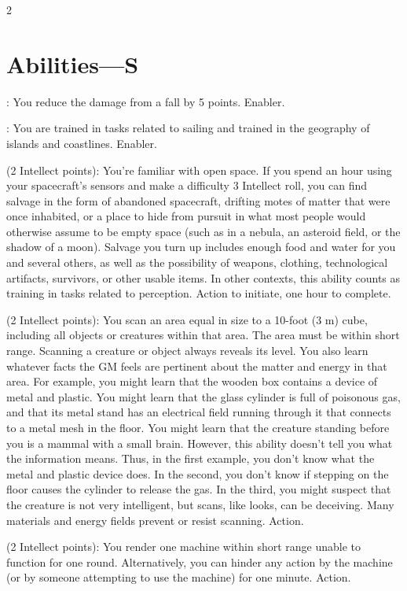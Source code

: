 \begin{multicols}{2}

\section{Abilities—S}

: You reduce the damage from a fall by 5 points. Enabler. 
 
: You are trained in tasks related to sailing and trained in the geography of islands and coastlines. Enabler. 
 
 (2 Intellect points): You’re familiar with open space. If you spend an hour using your spacecraft’s sensors and make a difficulty 3 Intellect roll, you can find salvage in the form of abandoned spacecraft, drifting motes of matter that were once inhabited, or a place to hide from pursuit in what most people would otherwise assume to be empty space (such as in a nebula, an asteroid field, or the shadow of a moon). Salvage you turn up includes enough food and water for you and several others, as well as the possibility of weapons, clothing, technological artifacts, survivors, or other usable items. In other contexts, this ability counts as training in tasks related to perception. Action to initiate, one hour to complete.
 
 (2 Intellect points): You scan an area equal in size to a 10-foot (3 m) cube, including all objects or creatures within that area. The area must be within short range. Scanning a creature or object always reveals its level. You also learn whatever facts the GM feels are pertinent about the matter and energy in that area. For example, you might learn that the wooden box contains a device of metal and plastic. You might learn that the glass cylinder is full of poisonous gas, and that its metal stand has an electrical field running through it that connects to a metal mesh in the floor. You might learn that the creature standing before you is a mammal with a small brain. However, this ability doesn’t tell you what the information means. Thus, in the first example, you don’t know what the metal and plastic device does. In the second, you don’t know if stepping on the floor causes the cylinder to release the gas. In the third, you might suspect that the creature is not very intelligent, but scans, like looks, can be deceiving. Many materials and energy fields prevent or resist scanning. Action. 
 
 (2 Intellect points): You render one machine within short range unable to function for one round. Alternatively, you can hinder any action by the machine (or by someone attempting to use the machine) for one minute. Action. 
 

\end{multicols}
